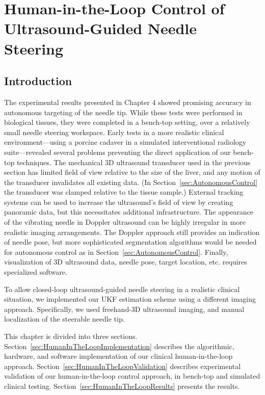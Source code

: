 \chapter[Human-in-the-Loop Control]{Human-in-the-Loop Control of Ultrasound-Guided Needle Steering}

\section{Introduction}
The experimental results presented in Chapter 4 showed promising accuracy in autonomous targeting of the needle tip. While these tests were performed in biological tissues, they were completed in a bench-top setting, over a relatively small needle steering workspace. Early tests in a more realistic clinical environment---using a porcine cadaver in a simulated interventional radiology suite---revealed several problems preventing the direct application of our bench-top techniques. The mechanical 3D ultrasound transducer used in the previous section has limited field of view relative to the size of the liver, and any motion of the transducer invalidates all existing data. (In Section~\ref{sec:AutonomousControl} the transducer was clamped relative to the tissue sample.) External tracking systems can be used to increase the ultrasound's field of view by creating panoramic data, but this necessitates additional infrastructure. The appearance of the vibrating needle in Doppler ultrasound can be highly irregular in more realistic imaging arrangements. The Doppler approach still provides an indication of needle pose, but more sophisticated segmentation algorithms would be needed for autonomous control as in Section~\ref{sec:AutonomousControl}. Finally, visualization of 3D ultrasound data, needle pose, target location, etc. requires specialized software.

To allow closed-loop ultrasound-guided needle steering in a realistic clinical situation, we implemented our UKF estimation scheme using a different imaging approach. Specifically, we used freehand-3D ultrasound imaging, and manual localization of the steerable needle tip. 

This chapter is divided into three sections. Section~\ref{sec:HumanInTheLoopImplementation} describes the algorithmic, hardware, and software implementation of our clinical human-in-the-loop approach. Section~\ref{sec:HumanInTheLoopValidation} describes experimental validation of our human-in-the-loop control approach, in bench-top and simulated clinical testing. Section~\ref{sec:HumanInTheLoopResults} presents the results.


